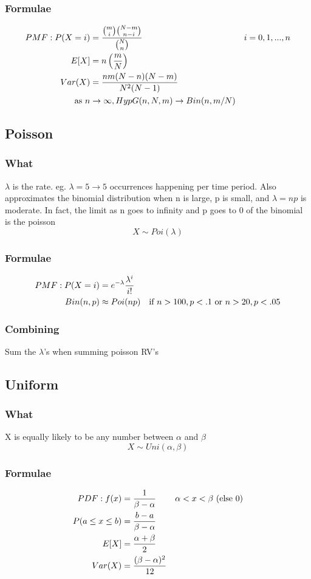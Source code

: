 \documentclass[12pt]{amsart}
\begin{document}
\subsubsection{Formulae}
\begin{align*}
PMF: P(X = i) &= { {m \choose i} {N-m \choose n-i} \over {N \choose n}} &i=0,1,...,n \\
E[X] &= n \left( {m \over N} \right) \\
Var(X) &= {nm(N-n)(N-m) \over N^2 (N-1)} \\
\text{as } n &\to \infty, HypG(n, N, m) \to Bin(n, m/N)
\end{align*}
%
\subsection{Poisson}
\subsubsection{What}
$\lambda$ is the rate. eg. $\lambda = 5 \to 5$ occurrences happening per time period. Also approximates the binomial distribution when n is large, p is small, and $\lambda = np$ is moderate. In fact, the limit as n goes to infinity and p goes to 0 of the binomial is the poisson
\[
X \sim Poi(\lambda)
\]
\subsubsection{Formulae}
\begin{align*}
PMF: P(X=i) &= e^{-\lambda} {\lambda^i \over i!} \\
Bin(n, p) &\approx Poi(np) & \text{if } n > 100, p < .1 \text{ or } n > 20, p < .05
\end{align*}
\subsubsection{Combining}
Sum the $\lambda$'s when summing poisson RV's
%
\subsection{Uniform}
\subsubsection{What}
X is equally likely to be any number between $\alpha$ and $\beta$
\[
X \sim Uni(\alpha, \beta)
\]
\subsubsection{Formulae}
\begin{align*}
PDF: f(x) &= {1 \over \beta - \alpha} & \alpha < x < \beta \text{ (else 0)} \\
P(a \leq x \leq b) &= {b - a \over \beta - \alpha} \\
E[X] &= {\alpha + \beta \over 2} \\
Var(X) &= {(\beta - \alpha)^2 \over 12}
\end{align*}
%
\end{document}
